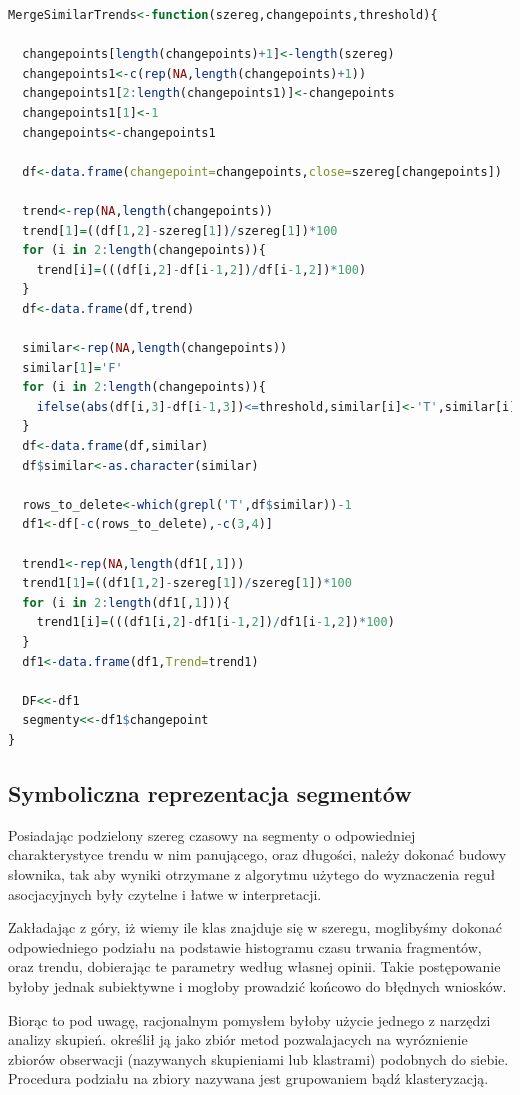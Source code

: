 \documentclass[polish, twoside, 12pt, a4paper]{article}
\theoremstyle{definition}
\theoremstyle{plain}
\theoremstyle{remark}
\begin{document}
\begin{lstlisting}[language=R]
MergeSimilarTrends<-function(szereg,changepoints,threshold){

  changepoints[length(changepoints)+1]<-length(szereg)
  changepoints1<-c(rep(NA,length(changepoints)+1))
  changepoints1[2:length(changepoints1)]<-changepoints
  changepoints1[1]<-1
  changepoints<-changepoints1
  
  df<-data.frame(changepoint=changepoints,close=szereg[changepoints])
  
  trend<-rep(NA,length(changepoints))
  trend[1]=((df[1,2]-szereg[1])/szereg[1])*100
  for (i in 2:length(changepoints)){
    trend[i]=(((df[i,2]-df[i-1,2])/df[i-1,2])*100)
  }
  df<-data.frame(df,trend)
  
  similar<-rep(NA,length(changepoints))
  similar[1]='F'
  for (i in 2:length(changepoints)){
    ifelse(abs(df[i,3]-df[i-1,3])<=threshold,similar[i]<-'T',similar[i]<-'F')
  }
  df<-data.frame(df,similar)
  df$similar<-as.character(similar)
  
  rows_to_delete<-which(grepl('T',df$similar))-1
  df1<-df[-c(rows_to_delete),-c(3,4)]
  
  trend1<-rep(NA,length(df1[,1]))
  trend1[1]=((df1[1,2]-szereg[1])/szereg[1])*100
  for (i in 2:length(df1[,1])){
    trend1[i]=(((df1[i,2]-df1[i-1,2])/df1[i-1,2])*100)
  }
  df1<-data.frame(df1,Trend=trend1)
  
  DF<<-df1
  segmenty<<-df1$changepoint
}
\end{lstlisting}

\subsection{Symboliczna reprezentacja segmentów}

Posiadając podzielony szereg czasowy na segmenty o odpowiedniej charakterystyce trendu w nim panującego, oraz długości, należy dokonać budowy słownika, tak aby wyniki otrzymane z algorytmu użytego 
do wyznaczenia reguł asocjacyjnych były czytelne i łatwe w interpretacji.

Zakładając z góry, iż wiemy ile klas znajduje się w szeregu, moglibyśmy dokonać odpowiedniego podziału na podstawie histogramu czasu trwania fragmentów, oraz trendu, dobierając te parametry według własnej opinii. 
Takie postępowanie byłoby jednak subiektywne i mogłoby prowadzić końcowo do błędnych wniosków.

Biorąc to pod uwagę, racjonalnym pomysłem byłoby użycie jednego z narzędzi analizy skupień. \cite{BiecekPrzemysawTrajkowski2011} określił ją jako zbiór metod pozwalajacych na wyróznienie zbiorów 
obserwacji (nazywanych skupieniami lub klastrami) podobnych do siebie. Procedura podziału na zbiory nazywana jest grupowaniem bądź klasteryzacją. 
\end{document}
